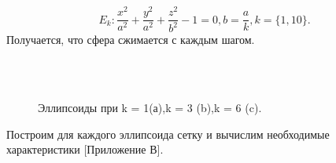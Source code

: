 $$ E_{k}: \frac{x^{2}}{a^{2}} + \frac{y ^{2}}{a^{2}} + \frac{z^{2}}{b^{2}} - 1 = 0, b = \frac{a}{k}, k = \{1,10\}. $$
Получается, что сфера сжимается с каждым шагом. 
\begin{figure}[H]
	\centering
	\label{fig:A}
	 \\
	\\
	\caption{Эллипсоиды при k = 1(а),k = 3 (b),k = 6 (c).}
\end{figure}
Построим для каждого эллипсоида сетку и вычислим необходимые характеристики [Приложение В].
